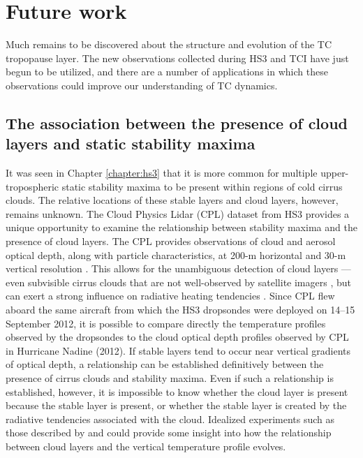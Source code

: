 \section{Future work}

Much remains to be discovered about the structure and evolution of the TC tropopause layer.
The new observations collected during HS3 and TCI have just begun to be utilized, and there are a number of applications in which these observations could improve our understanding of TC dynamics.

\subsection{The association between the presence of cloud layers and static stability maxima}

It was seen in Chapter \ref{chapter:hs3} that it is more common for multiple upper-tropospheric static stability maxima to be present within regions of cold cirrus clouds.
The relative locations of these stable layers and cloud layers, however, remains unknown.
The Cloud Physics Lidar (CPL) dataset from HS3 provides a unique opportunity to examine the relationship between stability maxima and the presence of cloud layers.
The CPL provides observations of cloud and aerosol optical depth, along with particle characteristics, at 200-m horizontal and 30-m vertical resolution \citep{CPL}.
This allows for the unambiguous detection of cloud layers --- even subvisible cirrus clouds that are not well-observed by satellite imagers \citep{Braunetal2016}, but can exert a strong influence on radiative heating tendencies \citep{Durranetal2009}.
Since CPL flew aboard the same aircraft from which the HS3 dropsondes were deployed on 14--15 September 2012, it is possible to compare directly the temperature profiles observed by the dropsondes to the cloud optical depth profiles observed by CPL in Hurricane Nadine (2012).
If stable layers tend to occur near vertical gradients of optical depth, a relationship can be established definitively between the presence of cirrus clouds and stability maxima.
Even if such a relationship is established, however, it is impossible to know whether the cloud layer is present because the stable layer is present, or whether the stable layer is created by the radiative tendencies associated with the cloud.
Idealized experiments such as those described by \cite{Durranetal2009} and \cite{Dinhetal2010} could provide some insight into how the relationship between cloud layers and the vertical temperature profile evolves.

